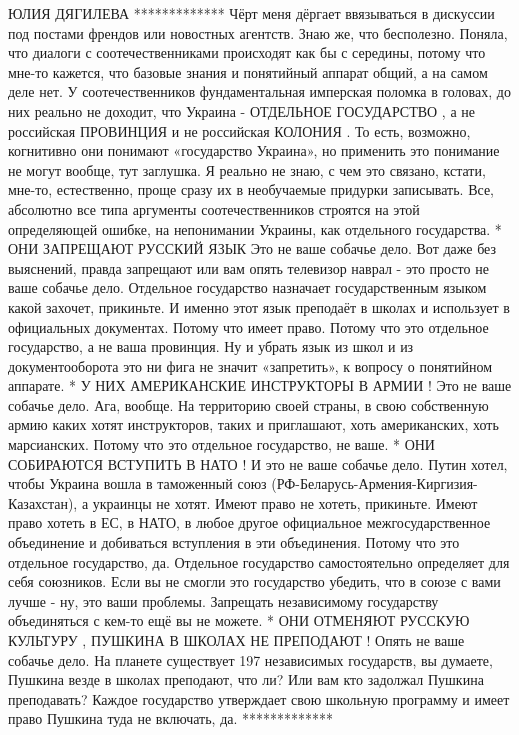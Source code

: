 ЮЛИЯ ДЯГИЛЕВА
*************
Чёрт меня дёргает ввязываться в дискуссии под постами френдов или новостных агентств. Знаю же, что бесполезно.
Поняла, что диалоги с соотечественниками происходят как бы с середины, потому что мне-то кажется, что базовые знания и понятийный аппарат общий, а на самом деле нет.
У соотечественников фундаментальная имперская поломка в головах, до них реально не доходит, что Украина - ОТДЕЛЬНОЕ ГОСУДАРСТВО , а не российская ПРОВИНЦИЯ и не российская КОЛОНИЯ .
То есть, возможно, когнитивно они понимают «государство Украина», но применить это понимание не могут вообще, тут заглушка.
Я реально не знаю, с чем это связано, кстати, мне-то, естественно, проще сразу их в необучаемые придурки записывать.
Все, абсолютно все типа аргументы соотечественников строятся на этой определяющей ошибке, на непонимании Украины, как отдельного государства.
* ОНИ ЗАПРЕЩАЮТ РУССКИЙ ЯЗЫК
Это не ваше собачье дело. Вот даже без выяснений, правда запрещают или вам опять телевизор наврал - это просто не ваше собачье дело. Отдельное государство назначает государственным языком какой захочет, прикиньте. И именно этот язык преподаёт в школах и использует в официальных документах. Потому что имеет право. Потому что это отдельное государство, а не ваша провинция.
Ну и убрать язык из школ и из документооборота это ни фига не значит «запретить», к вопросу о понятийном аппарате.
* У НИХ АМЕРИКАНСКИЕ ИНСТРУКТОРЫ В АРМИИ !
Это не ваше собачье дело. Ага, вообще. На территорию своей страны, в свою собственную армию каких хотят инструкторов, таких и приглашают, хоть американских, хоть марсианских. Потому что это отдельное государство, не ваше.
* ОНИ СОБИРАЮТСЯ ВСТУПИТЬ В НАТО !
И это не ваше собачье дело. Путин хотел, чтобы Украина вошла в таможенный союз (РФ-Беларусь-Армения-Киргизия-Казахстан), а украинцы не хотят. Имеют право не хотеть, прикиньте. Имеют право хотеть в ЕС, в НАТО, в любое другое официальное межгосударственное объединение и добиваться вступления в эти объединения. Потому что это отдельное государство, да. Отдельное государство самостоятельно определяет для себя союзников. Если вы не смогли это государство убедить, что в союзе с вами лучше - ну, это ваши проблемы. Запрещать независимому государству объединяться с кем-то ещё вы не можете.
* ОНИ ОТМЕНЯЮТ РУССКУЮ КУЛЬТУРУ , ПУШКИНА В ШКОЛАХ НЕ ПРЕПОДАЮТ !
Опять не ваше собачье дело. На планете существует 197 независимых государств, вы думаете, Пушкина везде в школах преподают, что ли? Или вам кто задолжал Пушкина преподавать? Каждое государство утверждает свою школьную программу и имеет право Пушкина туда не включать, да.
*************

